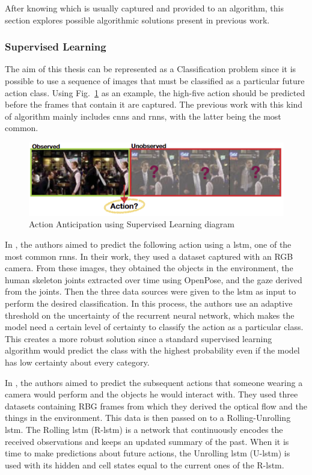 After knowing which is usually captured and provided to an algorithm, this section explores possible algorithmic solutions present in previous work.

\subsubsection{Supervised Learning}

The aim of this thesis can be represented as a Classification problem since it is possible to use a sequence of images that must be classified as a particular future action class. Using Fig.~\ref{superviseddiagram} as an example, the high-five action should be predicted before the frames that contain it are captured. The previous work with this kind of algorithm mainly includes \acp{cnn} and \acp{rnn}, with the latter being the most common.

\begin{figure}[H]
\centerline{\includegraphics[width=6in]{figs/superviseddiagram.PNG}}
\caption{Action Anticipation using Supervised Learning diagram\cite{Gammulle2019}}
\label{superviseddiagram}
\end{figure}

In \cite{Canuto2021}, the authors aimed to predict the following action using a \acs{lstm}, one of the most common \acp{rnn}. In their work, they used a dataset captured with an RGB camera. From these images, they obtained the objects in the environment, the human skeleton joints extracted over time using OpenPose, and the gaze derived from the joints. Then the three data sources were given to the \acs{lstm} as input to perform the desired classification. In this process, the authors use an adaptive threshold on the uncertainty of the recurrent neural network, which makes the model need a certain level of certainty to classify the action as a particular class. This creates a more robust solution since a standard supervised learning algorithm would predict the class with the highest probability even if the model has low certainty about every category.

In \cite{Furnari2021}, the authors aimed to predict the subsequent actions that someone wearing a camera would perform and the objects he would interact with. They used three datasets containing RBG frames from which they derived the optical flow and the things in the environment. This data is then passed on to a Rolling-Unrolling \acs{lstm}. The Rolling \acs{lstm} (R-\acs{lstm}) is a network that continuously encodes the received observations and keeps an updated summary of the past. When it is time to make predictions about future actions, the Unrolling \acs{lstm} (U-\acs{lstm}) is used with its hidden and cell states equal to the current ones of the R-\acs{lstm}.

